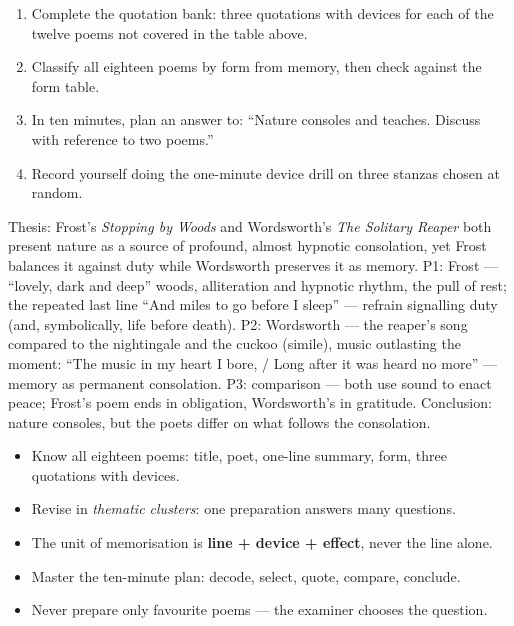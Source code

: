 \documentclass[11pt]{article}
\begin{document}
\begin{exercice}
\begin{enumerate}
\item Complete the quotation bank: three quotations with devices for each of the twelve poems not covered in the table above.
\item Classify all eighteen poems by form from memory, then check against the form table.
\item In ten minutes, plan an answer to: ``Nature consoles and teaches. Discuss with reference to two poems.''
\item Record yourself doing the one-minute device drill on three stanzas chosen at random.
\end{enumerate}
\end{exercice}

\begin{corrige}
Thesis: Frost's \emph{Stopping by Woods} and Wordsworth's \emph{The Solitary Reaper} both present nature as a source of profound, almost hypnotic consolation, yet Frost balances it against duty while Wordsworth preserves it as memory. P1: Frost — ``lovely, dark and deep'' woods, alliteration and hypnotic rhythm, the pull of rest; the repeated last line ``And miles to go before I sleep'' — refrain signalling duty (and, symbolically, life before death). P2: Wordsworth — the reaper's song compared to the nightingale and the cuckoo (simile), music outlasting the moment: ``The music in my heart I bore, / Long after it was heard no more'' — memory as permanent consolation. P3: comparison — both use sound to enact peace; Frost's poem ends in obligation, Wordsworth's in gratitude. Conclusion: nature consoles, but the poets differ on what follows the consolation.
\end{corrige}

\begin{aretenir}
\begin{itemize}
\item Know all eighteen poems: title, poet, one-line summary, form, three quotations with devices.
\item Revise in \emph{thematic clusters}: one preparation answers many questions.
\item The unit of memorisation is \textbf{line + device + effect}, never the line alone.
\item Master the ten-minute plan: decode, select, quote, compare, conclude.
\item Never prepare only favourite poems — the examiner chooses the question.
\end{itemize}
\end{aretenir}
\end{document}
